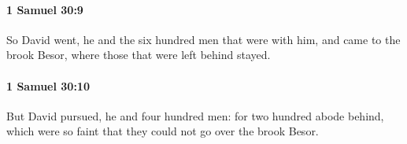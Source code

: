 		\paragraph{1 Samuel 30:9} %
			\label{1SAMUEL-30-9}

			So David went, he and the six hundred men that were with him, and came to the brook Besor, where those that were left behind stayed.


		\paragraph{1 Samuel 30:10} %
			\label{1SAMUEL-30-10}

			But David pursued, he and four hundred men: for two hundred abode behind, which were so faint that they could not go over the brook Besor.


